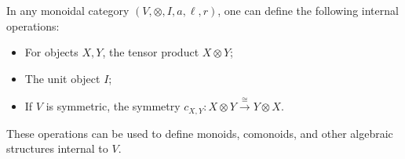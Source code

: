 In any monoidal category $(V, \otimes, I, a, \ell, r)$, one can define the following internal operations:
\begin{itemize}
\item For objects $X, Y$, the tensor product $X \otimes Y$;
\item The unit object $I$;
\item If $V$ is symmetric, the symmetry $c_{X,Y}: X \otimes Y \xrightarrow{\cong} Y \otimes X$.
\end{itemize}
These operations can be used to define monoids, comonoids, and other algebraic structures internal to $V$.